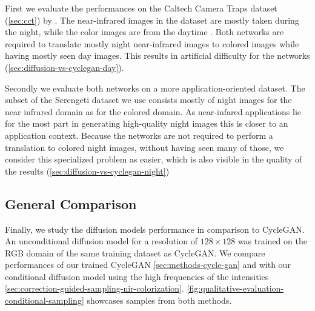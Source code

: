 
First we evaluate the performances on the Caltech Camera Traps dataset (\autoref{sec:cct}) by .
The near-infrared images in the dataset are mostly taken during the night, while the color images are from the daytime \parencite{caltech}.
Both networks are required to translate mostly night near-infrared images to colored images while having mostly seen day images.
This results in artificial difficulty for the networks (\autoref{sec:diffusion-vs-cyclegan-day}).

Secondly we evaluate both networks on a more application-oriented dataset.
The subset of the Serengeti dataset we use consists mostly of night images for the near infrared domain as for the colored domain.
As near-infared applications lie for the most part in generating high-quality night images this is closer to an application context.
Because the networks are not required to perform a translation to colored night images, without having seen many of those, we consider
this specialized problem as easier, which is also visible in the quality of the results (\autoref{sec:diffusion-vs-cyclegan-night})

\subsection{General Comparison}
\label{sec:diffusion-vs-cyclegan-night}
Finally, we study the diffusion models performance in comparison to CycleGAN.
An unconditional diffusion model for a resolution of $128 \times 128$ was trained on the RGB domain of the same training dataset as CycleGAN.
We compare performances of our trained CycleGAN \autoref{sec:methods-cycle-gan} and with our conditional diffusion model using the high frequencies of the intensities \autoref{sec:correction-guided-sampling-nir-colorization}.
\autoref{fig:qualitative-evaluation-conditional-sampling} showcases samples from both methods.

